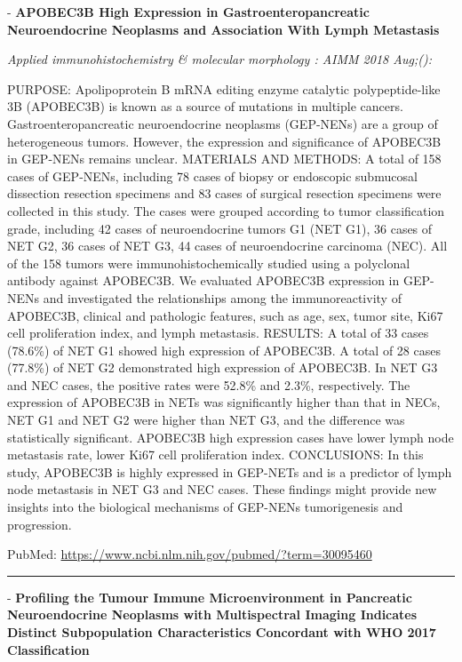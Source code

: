 \documentclass[]{article}
\begin{document}
 - \textbf{APOBEC3B High Expression in Gastroenteropancreatic
Neuroendocrine Neoplasms and Association With Lymph Metastasis}

\emph{Applied immunohistochemistry \& molecular morphology : AIMM 2018
Aug;():}

PURPOSE: Apolipoprotein B mRNA editing enzyme catalytic polypeptide-like
3B (APOBEC3B) is known as a source of mutations in multiple cancers.
Gastroenteropancreatic neuroendocrine neoplasms (GEP-NENs) are a group
of heterogeneous tumors. However, the expression and significance of
APOBEC3B in GEP-NENs remains unclear. MATERIALS AND METHODS: A total of
158 cases of GEP-NENs, including 78 cases of biopsy or endoscopic
submucosal dissection resection specimens and 83 cases of surgical
resection specimens were collected in this study. The cases were grouped
according to tumor classification grade, including 42 cases of
neuroendocrine tumors G1 (NET G1), 36 cases of NET G2, 36 cases of NET
G3, 44 cases of neuroendocrine carcinoma (NEC). All of the 158 tumors
were immunohistochemically studied using a polyclonal antibody against
APOBEC3B. We evaluated APOBEC3B expression in GEP-NENs and investigated
the relationships among the immunoreactivity of APOBEC3B, clinical and
pathologic features, such as age, sex, tumor site, Ki67 cell
proliferation index, and lymph metastasis. RESULTS: A total of 33 cases
(78.6\%) of NET G1 showed high expression of APOBEC3B. A total of 28
cases (77.8\%) of NET G2 demonstrated high expression of APOBEC3B. In
NET G3 and NEC cases, the positive rates were 52.8\% and 2.3\%,
respectively. The expression of APOBEC3B in NETs was significantly
higher than that in NECs, NET G1 and NET G2 were higher than NET G3, and
the difference was statistically significant. APOBEC3B high expression
cases have lower lymph node metastasis rate, lower Ki67 cell
proliferation index. CONCLUSIONS: In this study, APOBEC3B is highly
expressed in GEP-NETs and is a predictor of lymph node metastasis in NET
G3 and NEC cases. These findings might provide new insights into the
biological mechanisms of GEP-NENs tumorigenesis and progression.

PubMed: \url{https://www.ncbi.nlm.nih.gov/pubmed/?term=30095460}

{}

{}

\begin{center}\rule{0.5\linewidth}{\linethickness}\end{center}

 - \textbf{Profiling the Tumour Immune Microenvironment in Pancreatic
Neuroendocrine Neoplasms with Multispectral Imaging Indicates Distinct
Subpopulation Characteristics Concordant with WHO 2017 Classification}
\end{document}
